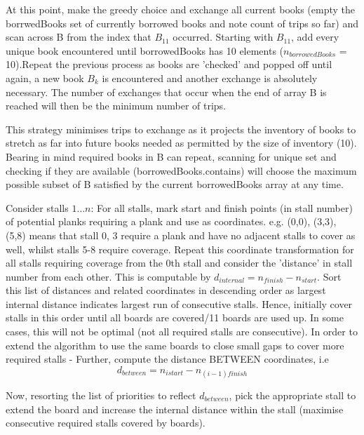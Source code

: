\documentclass[11pt, a4paper]{article}
\begin{document}
{{{At this point, make the greedy choice and exchange all current books (empty the borrwedBooks set of currently borrowed books and note count of trips so far) and scan across B from the index that $B_11$ occurred. Starting with $B_{ 11 }$, add every unique book encountered until borrowedBooks has 10 elements ($n_{borrowedBooks}$ = 10).Repeat the previous process as books are 'checked' and popped off until again, a new book $B_k$ is encountered and another exchange is absolutely necessary. The number of exchanges that occur when the end of array B is reached will then be the minimum number of trips.

This strategy minimises trips to exchange as it projects the inventory of books to stretch as far into future books needed as permitted by the size of inventory (10). Bearing in mind required books in B can repeat, scanning for unique set and checking if they are available (borrowedBooks.contains) will choose the maximum possible subset of B satisfied by the current borrowedBooks array at any time.


Consider stalls $1\dots n$:
For all stalls, mark start and finish points (in stall number) of potential planks requiring a plank and use as coordinates.
e.g. (0,0), (3,3), (5,8) means that stall 0, 3 require a plank and have no adjacent stalls to cover as well, whilst stalls 5-8 require coverage.
Repeat this coordinate transformation for all stalls requiring coverage from the 0th stall and consider the 'distance' in stall number from each other. This is computable by $d_{internal} = n_{finish} - n_{start}$.
Sort this list of distances and related coordinates in descending order as largest internal distance indicates largest run of consecutive stalls.
Hence, initially cover stalls in this order until all boards are covered/11 boards are used up.
In some cases, this will not be optimal (not all required stalls are consecutive).
In order to extend the algorithm to use the same boards to close small gaps to cover more required stalls - Further, compute the distance BETWEEN coordinates, i.e
\[ d_{between} = n_{istart} - n_{(i-1)finish} \]

Now, resorting the list of priorities to reflect $d_{between}$, pick the appropriate stall to extend the board and increase the internal distance within the stall (maximise consecutive required stalls covered by boards).

}}}
\end{document}

